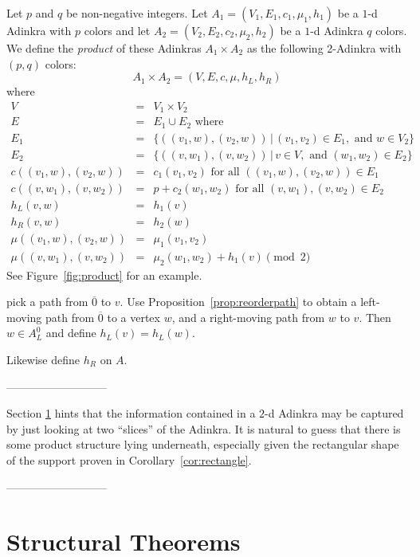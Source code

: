 \begin{construction}
\label{const:product}
Let $p$ and $q$ be non-negative integers.  Let $A_1=(V_1, E_1, c_1, \mu_1,h_1)$ be a $1$-d Adinkra with $p$ colors and let $A_2=(V_2, E_2, c_2, \mu_2,h_2)$ be a $1$-d Adinkra $q$ colors.  We define the \emph{product} of these Adinkras $A_1\times A_2$ as the following 2-Adinkra with $(p,q)$ colors:
\[A_1\times A_2=(V,E,c,\mu,h_L,h_R)\]
where
\begin{eqnarray*}
V&=&V_1\times V_2\\
E&=&E_1\cup E_2\mbox{ where}\\
E_1&=&\{((v_1,w),(v_2,w))\,|\,(v_1, v_2)\in E_1,\mbox{ and } w\in V_2\}\\
E_2&=&\{((v,w_1),(v,w_2))\,|\,v\in V, \mbox{ and }(w_1,w_2)\in E_2\}\\
c((v_1,w),(v_2,w))&=&c_1(v_1,v_2)\mbox{ for all $((v_1,w),(v_2,w))\in E_1$}\\
c((v,w_1),(v,w_2))&=&p+c_2(w_1,w_2)\mbox{ for all $(v,w_1),(v,w_2)\in E_2$}\\
h_L(v,w)&=&h_1(v)\\
h_R(v,w)&=&h_2(w)\\
\mu((v_1,w),(v_2,w))&=&\mu_1(v_1,v_2)\\
\mu((v,w_1),(v,w_2))&=&\mu_2(w_1,w_2)+h_1(v)\pmod{2}
\end{eqnarray*}
See Figure~\ref{fig:product} for an example.
\end{construction}



pick a path from $\overline{0}$ to $v$.  Use Proposition~\ref{prop:reorderpath} to obtain a left-moving path from $\overline{0}$ to a vertex $w$, and a right-moving path from $w$ to $v$.  Then $w\in A_L^0$ and define $h_L(v)=h_L(w)$.

Likewise define $h_R$ on $A$.

---------------------------

Section \ref{sec:structural} hints that the information contained in a $2$-d Adinkra may be captured by just looking at two ``slices'' of the Adinkra. It is natural to guess that there is some product structure lying underneath, especially given the rectangular shape of the support proven in Corollary~\ref{cor:rectangle}. 

---------------------------
\section{Structural Theorems}
\label{sec:structural}

